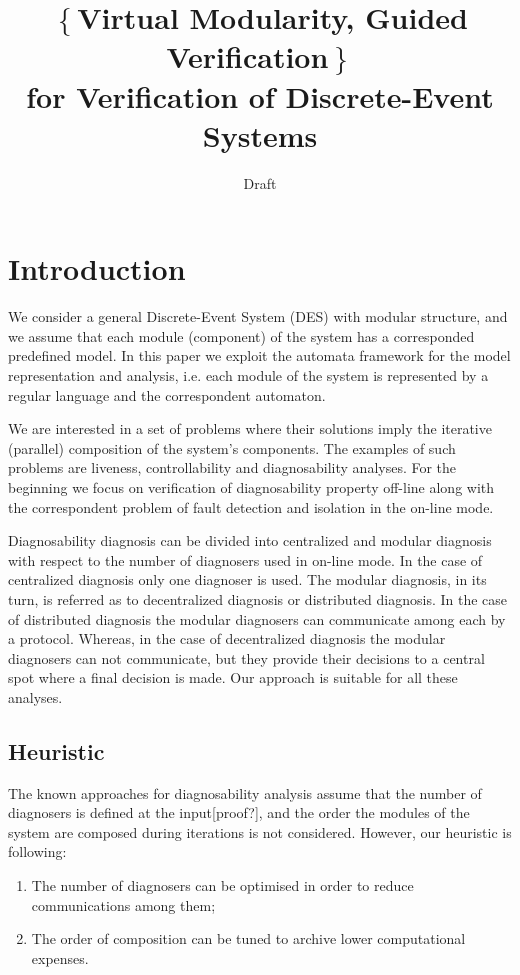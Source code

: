 \documentclass[a4paper,oneside]{article}
\begin{document}
\title{$\left\{\right.$Virtual Modularity, Guided Verification$\left.\right\}$
\\ for Verification of Discrete-Event Systems}
	\author{Draft}
\maketitle


\newtheorem{conjecture}{Conjecture}
\newtheorem{corollary}{Corollary}
\newtheorem{theorem}{Theorem}
\newtheorem{example}{Example}
\newtheorem{assumption}{Assumption}
\newtheorem{definition}{Definition}

\section{Introduction}
We consider a general Discrete-Event System (DES) with modular structure, and we
assume that each module (component) of the system has a corresponded predefined
model. In this paper we exploit the automata framework for the model
representation and analysis, i.e. each module of the system is represented by a
regular language and the correspondent automaton.

We are interested in a set of problems where their solutions imply the iterative
(parallel) composition of the system's components. The examples of such problems
are liveness, controllability and diagnosability analyses. For the beginning we
focus on verification of diagnosability property off-line along with the
correspondent problem of fault detection and isolation in the on-line mode.

Diagnosability diagnosis can be divided into centralized and modular diagnosis
with respect to the number of diagnosers used in on-line mode. In the case of
centralized diagnosis only one diagnoser is used.
The modular diagnosis, in its turn, is referred as to decentralized diagnosis or
distributed diagnosis. In the case of distributed diagnosis the modular
diagnosers can communicate among each by a protocol. Whereas, in the case of
decentralized diagnosis the modular diagnosers can not communicate, but they
provide their decisions to a central spot where a final decision is made.
Our approach is suitable for all these analyses.

\subsection{Heuristic}
\label{sec_heuristic}
The known approaches for diagnosability analysis assume that the number of
diagnosers is defined at the input[proof?], and the order the modules of the
system are composed during iterations is not considered. However, our heuristic
is following:
\begin{enumerate}
  \item The number of diagnosers can be optimised in order to reduce
  communications among them;
  \item The order of composition can be tuned to archive lower computational
  expenses.
\end{enumerate}
\end{document}
